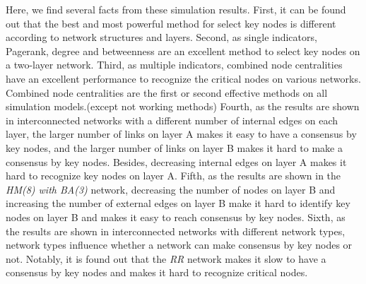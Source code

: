 Here, we find several facts from these simulation results. First, it can be found out that the best and most powerful method for select key nodes is different according to network structures and layers. Second, as single indicators, Pagerank, degree and betweenness are an excellent method to select key nodes on a two-layer network. Third, as multiple indicators, combined node centralities have an excellent performance to recognize the critical nodes on various networks. Combined node centralities are the first or second effective methods on all simulation models.(except not working methods)  Fourth, as the results are shown in interconnected networks with a different number of internal edges on each layer, the larger number of links on layer A makes it easy to have a consensus by key nodes, and the larger number of links on layer B makes it hard to make a consensus by key nodes. Besides, decreasing internal edges on layer A makes it hard to recognize key nodes on layer A.  Fifth, as the results are shown in the \textit{HM(8) with BA(3)} network, decreasing the number of nodes on layer B and increasing the number of external edges on layer B make it hard to identify key nodes on layer B and makes it easy to reach consensus by key nodes. Sixth, as the results are shown in interconnected networks with different network types, network types influence whether a network can make consensus by key nodes or not. Notably, it is found out that the \textit{RR} network makes it slow to have a consensus by key nodes and makes it hard to recognize critical nodes. \\



